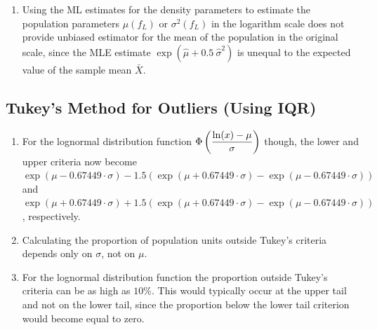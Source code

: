 \begin{enumerate}
    \item Using the ML estimates for the density parameters to estimate the population parameters $\mu( f _L )$ or $\sigma^2( f_L )$ in the logarithm scale does not provide unbiased estimator for the mean of the population in the original scale, since the MLE estimate $\exp( \hat{\mu} + 0.5 \ \hat{\sigma}^2)$ is unequal to the expected value of the sample mean $\bar{X}$.
    \hfill \cite{statistics/book/Statistics-for-Data-Scientists/Maurits-Kaptein}
\end{enumerate}



\subsection{Tukey’s Method for Outliers (Using IQR)}

\begin{enumerate}
    \item For the lognormal distribution function $\Phi\left(\dfrac{\ln(x) - \mu}{\sigma}\right)$ though, the lower and upper criteria now become 
    \hfill \cite{statistics/book/Statistics-for-Data-Scientists/Maurits-Kaptein}
    \\
    $\exp(\mu - 0.67449\cdot\sigma) - 1.5(\exp(\mu + 0.67449\cdot\sigma) - \exp(\mu - 0.67449\cdot\sigma))$ and 
    \hfill \cite{statistics/book/Statistics-for-Data-Scientists/Maurits-Kaptein}
    \\
    $\exp(\mu + 0.67449\cdot\sigma) + 1.5(\exp(\mu + 0.67449\cdot\sigma) - \exp(\mu - 0.67449\cdot\sigma))$, respectively. 
    \hfill \cite{statistics/book/Statistics-for-Data-Scientists/Maurits-Kaptein}
    
    \item Calculating the proportion of population units outside Tukey’s criteria depends only on $\sigma$, not on $\mu$. 
    \hfill \cite{statistics/book/Statistics-for-Data-Scientists/Maurits-Kaptein}

    \item For the lognormal distribution function the proportion outside Tukey’s criteria can be as high as $10\%$.
    This would typically occur at the upper tail and not on the lower tail, since the proportion below the lower tail criterion would become equal to zero. 
    \hfill \cite{statistics/book/Statistics-for-Data-Scientists/Maurits-Kaptein}

\end{enumerate}













